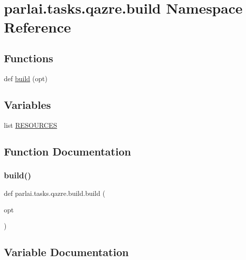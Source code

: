 \hypertarget{namespaceparlai_1_1tasks_1_1qazre_1_1build}{}\section{parlai.\+tasks.\+qazre.\+build Namespace Reference}
\label{namespaceparlai_1_1tasks_1_1qazre_1_1build}
\subsection*{Functions}
\begin{DoxyCompactItemize}
\item 
def \hyperlink{namespaceparlai_1_1tasks_1_1qazre_1_1build_a145136e1a407c8a4476fcc949082a74e}{build} (opt)
\end{DoxyCompactItemize}
\subsection*{Variables}
\begin{DoxyCompactItemize}
\item 
list \hyperlink{namespaceparlai_1_1tasks_1_1qazre_1_1build_acbf00e2cfd5147dbb50de675d984b1c5}{R\+E\+S\+O\+U\+R\+C\+ES}
\end{DoxyCompactItemize}


\subsection{Function Documentation}
\mbox{\label{namespaceparlai_1_1tasks_1_1qazre_1_1build_a145136e1a407c8a4476fcc949082a74e}} 
\subsubsection{\texorpdfstring{build()}{build()}}
{\footnotesize\ttfamily def parlai.\+tasks.\+qazre.\+build.\+build (\begin{DoxyParamCaption}\item[{}]{opt }\end{DoxyParamCaption})}



\subsection{Variable Documentation}
\mbox{\label{namespaceparlai_1_1tasks_1_1qazre_1_1build_acbf00e2cfd5147dbb50de675d984b1c5}} 
